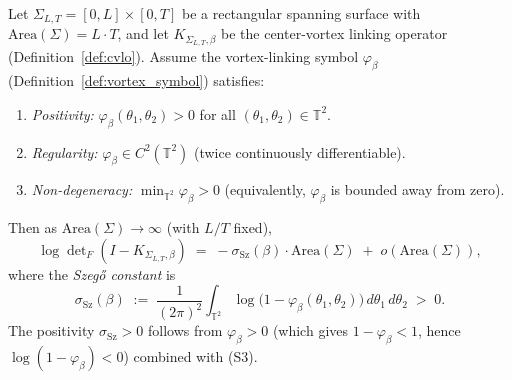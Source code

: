 \begin{theorem}
\label{thm:sltvsl}
Let $\Sigma_{L,T}=[0,L]\times[0,T]$ be a rectangular spanning
surface with $\mathrm{Area}(\Sigma)=L\cdot T$, and let
$K_{\Sigma_{L,T},\beta}$ be the center-vortex linking operator
(Definition~\ref{def:cvlo}). Assume the vortex-linking symbol
$\varphi_{\beta}$ (Definition~\ref{def:vortex_symbol}) satisfies:
\begin{enumerate}
\item[\textbf{(S1)}] \emph{Positivity:}
$\varphi_{\beta}(\theta_{1},\theta_{2})>0$ for all
$(\theta_{1},\theta_{2})\in\mathbb{T}^{2}$.
\item[\textbf{(S2)}] \emph{Regularity:}
$\varphi_{\beta}\in C^{2}(\mathbb{T}^{2})$ (twice continuously
differentiable).
\item[\textbf{(S3)}] \emph{Non-degeneracy:}
$\min_{\mathbb{T}^{2}}\varphi_{\beta}>0$ (equivalently,
$\varphi_{\beta}$ is bounded away from zero).
\end{enumerate}
Then as $\mathrm{Area}(\Sigma)\to\infty$ (with $L/T$ fixed),
\begin{equation}
\label{eq:szego_limit}
  \log\det\nolimits_{F}(I-K_{\Sigma_{L,T},\beta})
  \;=\;-\sigma_{\mathrm{Sz}}(\beta)\cdot\mathrm{Area}(\Sigma)
  \;+\;o(\mathrm{Area}(\Sigma)),
\end{equation}
where the \emph{Szeg\H{o} constant} is
\begin{equation}
\label{eq:szego_constant}
  \sigma_{\mathrm{Sz}}(\beta)
  \;:=\;\frac{1}{(2\pi)^{2}}\int_{\mathbb{T}^{2}}
  \log\!\bigl(1-\varphi_{\beta}(\theta_{1},\theta_{2})\bigr)\,
  d\theta_{1}\,d\theta_{2}
  \;>\;0.
\end{equation}
The positivity $\sigma_{\mathrm{Sz}}>0$ follows from
$\varphi_{\beta}>0$ (which gives
$1-\varphi_{\beta}<1$, hence $\log(1-\varphi_{\beta})<0$) combined
with (S3).
\end{theorem}

